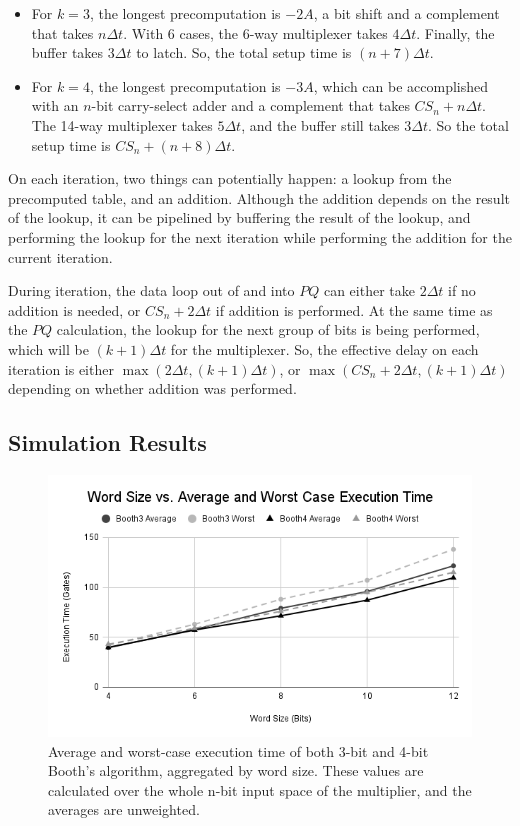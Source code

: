 \documentclass[12pt]{article}
\begin{document}
\begin{itemize}
    \item For $k = 3$, the longest precomputation is $-2A$, a bit shift and a
        complement that takes $n\Delta t$. With 6 cases, the 6-way multiplexer
        takes $4\Delta t$. Finally, the buffer takes $3\Delta t$ to latch. So,
        the total setup time is $(n + 7)\Delta t$.

    \item For $k = 4$, the longest precomputation is $-3A$, which can be
        accomplished with an $n$-bit carry-select adder and a complement that
        takes $CS_n + n\Delta t$. The 14-way
        multiplexer takes $5\Delta t$, and the buffer still takes $3\Delta t$.
        So the total setup time is $CS_n + (n + 8)\Delta t$.
\end{itemize}

On each iteration, two things can potentially happen: a lookup from the
precomputed table, and an addition. Although the addition depends on the result
of the lookup, it can be pipelined by buffering the result of the lookup, and
performing the lookup for the next iteration while performing the addition for
the current iteration.

During iteration, the data loop out of and into $PQ$ can either take $2\Delta
t$ if no addition is needed, or $CS_n + 2\Delta t$ if addition is performed. At
the same time as the $PQ$ calculation, the lookup for the next group of bits is
being performed, which will be $(k + 1)\Delta t$ for the multiplexer.  So, the
effective delay on each iteration is either $\max(2\Delta t, (k + 1)\Delta t)$,
or $\max(CS_n + 2\Delta t, (k + 1)\Delta t)$ depending on whether addition was
performed.

\subsection{Simulation Results}

\begin{figure}
    \includegraphics[scale=0.6]{delay-averages.png}
    \caption{
        Average and worst-case execution time of both 3-bit and 4-bit Booth's
        algorithm, aggregated by word size. These values are calculated over
        the whole n-bit input space of the multiplier, and the averages are
        unweighted.
    }
    \label{fig:delay-averages}
\end{figure}
\end{document}
